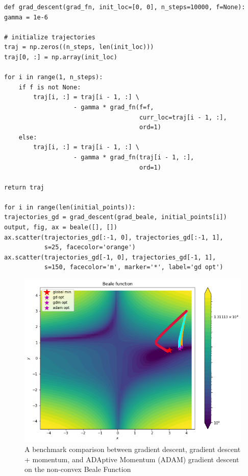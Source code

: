 \begin{tcolorbox}[colback=gray!5!white,colframe=gray!75!black]
\begin{verbatim}
def grad_descent(grad_fn, init_loc=[0, 0], n_steps=10000, f=None):
gamma = 1e-6

# initialize trajectories
traj = np.zeros((n_steps, len(init_loc)))
traj[0, :] = np.array(init_loc)

for i in range(1, n_steps):
    if f is not None:
        traj[i, :] = traj[i - 1, :] \
                   - gamma * grad_fn(f=f, 
                                     curr_loc=traj[i - 1, :], 
                                     ord=1)
    else:
        traj[i, :] = traj[i - 1, :] \
                   - gamma * grad_fn(traj[i - 1, :], 
                                     ord=1)

return traj

for i in range(len(initial_points)):
trajectories_gd = grad_descent(grad_beale, initial_points[i])
output, fig, ax = beale([], [])
ax.scatter(trajectories_gd[:-1, 0], trajectories_gd[:-1, 1], 
           s=25, facecolor='orange')
ax.scatter(trajectories_gd[-1, 0], trajectories_gd[-1, 1], 
           s=150, facecolor='m', marker='*', label='gd opt')
\end{verbatim}
\end{tcolorbox}

\begin{figure}[H]
    \centering
    \includegraphics[width = 15cm]{figures/gd_beale.png}
    \caption{A benchmark comparison between gradient descent, gradient descent + momentum, and ADAptive Momentum (ADAM) gradient descent on the non-convex Beale Function}
    \label{fig:learning_dist}
\end{figure}


